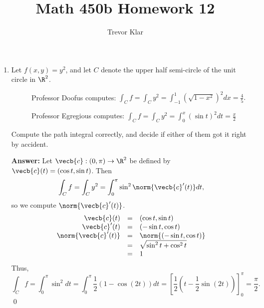 \documentclass[letterpaper]{article}
\title{Math 450b \linebreak
Homework 12}
\author{Trevor Klar}
\begin{document}
\maketitle

\begin{enumerate}
\item Let $f(x,y)=y^2$, and let $C$ denote the upper half semi-circle of the unit circle in $\R^2$. 
\begin{itemize}
\item[$\phantom{\bullet}$] Professor Doofus computes: $\int_C f=\int_C y^2=\int_{-1}^1(\sqrt{1-x^2})^2 dx = \frac{4}{5}.$
\item[$\phantom{\bullet}$] Professor Egregious computes: $\int_C f=\int_C y^2=\int_0^x(\sin t)^2 dt=\frac{x}{2}$
\end{itemize}
Compute the path integral correctly, and decide if either of them got it right by accident. 

\textbf{Answer:} Let $\vecb{c}:(0,\pi)\to \R^2$ be defined by $\vecb{c}(t)=(\cos t, \sin t)$. Then 
$$\int_C f=\int_C y^2=\int_0^\pi \sin^2 \norm{\vecb{c}'(t)}dt,$$
so we compute $\norm{\vecb{c}'(t)}$. 
\[\begin{array}{rcl}
\vecb{c}(t)&=&(\cos t, \sin t)\\
\vecb{c}'(t)&=&(-\sin t, \cos t)\\
\norm{\vecb{c}'(t)}&=&\norm{(-\sin t, \cos t)}\\
&=&\sqrt{\sin^2 t+\cos^2 t}\\
&=&1
\end{array}\]
Thus, $$\int_C f=\int_0^\pi \sin^2 dt=\int_0^\pi \frac{1}{2}(1-\cos(2t)) dt= \left[\frac{1}{2}(t-\frac{1}{2}\sin(2t))\right]_0^\pi=\frac{\pi}{2}.$$
\qed

\begin{comment}
\setcounter{enumi}{3}
\item Let $\vecb{c}$ be a $C^1$ path. 
	\begin{enumerate}[label=(\alph*)]
	\item Suppose $\vecb{F}$ is orthogonal to $\vecb{c}'(t)$ at $\vecb{c}(t)$ for all $t$. Show that $\int_{\vecb{c}}\vecb{F}\cdot d\vecb{s}=0.$
	\end{enumerate}
\end{comment}

\end{enumerate}
\end{document}
